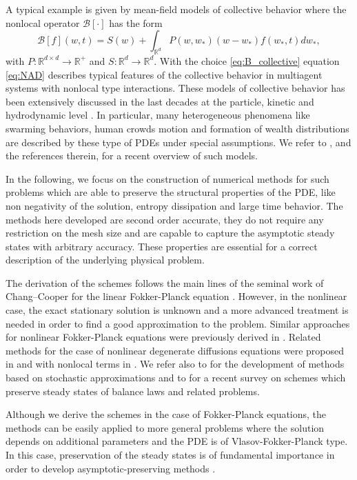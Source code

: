 \documentclass[a4paper]{article}
\theoremstyle{remark}\newtheorem{remark}{Remark}
\newcommand{\RR}{\mathbb{R}}
\newcommand{\B}{\mathcal{B}}
\newcommand{\be}{\begin{equation}}
\newcommand{\ee}{\end{equation}}
\begin{document}
A typical example is given by mean-field models of collective behavior where the nonlocal operator $\B[\cdot]$ has the form
 \be\label{eq:B_collective}
 \B[f](w,t) = S(w) + \int_{\RR^d} P(w,w_*)(w-w_*)f(w_*,t)dw_*,
 \ee
 with $P:\RR^{d\times d }\rightarrow \RR^+$ and $S:\RR^d\rightarrow \RR^d $. With the choice \eqref{eq:B_collective} equation \eqref{eq:NAD} describes typical features of the collective behavior in multiagent systems with nonlocal type interactions. These models of collective behavior has been extensively discussed in the last decades at the particle, kinetic and hydrodynamic level \cite{APTZ,APZc,BarDeg,BCCD,CCH,CChoH,CFRT,CS,DOCBC,T}. In particular, many heterogeneous phenomena like swarming behaviors, human crowds motion and formation of wealth distributions are described by these type of PDEs under special assumptions. We refer to \cite{NPT,PT2}, and the references therein, for a recent overview of such models.
 
In the following, we focus on the construction of numerical methods for such problems which are able to preserve the structural properties of the PDE, like non negativity of the solution, entropy dissipation and large time behavior. The methods here developed are second order accurate, they do not require any restriction on the mesh size and are capable to capture the asymptotic steady states with arbitrary accuracy. These properties are essential for a correct description of the underlying physical problem.

The derivation of the schemes follows the main lines of the seminal work of Chang--Cooper for the linear Fokker-Planck equation \cite{BuetDellacherie2010,ChCo,MB,SG}.
However, in the nonlinear case, the exact stationary solution is unknown and a more advanced treatment is needed in order to find a good approximation to the problem. Similar approaches for nonlinear Fokker-Planck equations were previously derived in \cite{BCDS,LLPS}. Related methods for the case of nonlinear degenerate diffusions equations were proposed in \cite{BCF,CJS} and with nonlocal terms in \cite{BCW,CCH}. We refer also to \cite{AlbiPareschi2013ab} for the development of methods based on stochastic approximations and to \cite{Gosse} for a recent survey on schemes which preserve steady states of balance laws and related problems.

Although we derive the schemes in the case of Fokker-Planck equations, the methods can be easily applied to more general problems where the solution depends on additional parameters and the PDE is of Vlasov-Fokker-Planck type. In this case, preservation of the steady states is of fundamental importance in order to develop asymptotic-preserving methods \cite{DP15}.
\end{document}
